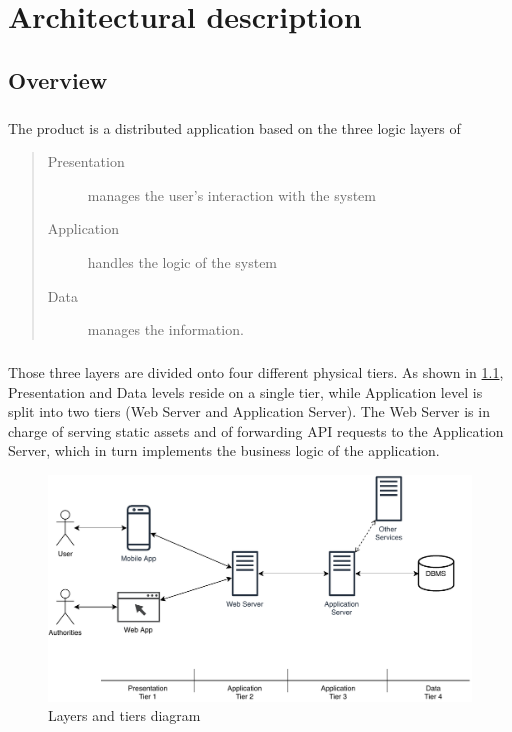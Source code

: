
	\chapter{Architectural description}
		\section{Overview}
			\paragraph{}
				The product is a distributed application based on the three logic layers of
				\begin{quote}
					\begin{description}
						\item[Presentation] manages the user's interaction with the system
						\item[Application] handles the logic of the system
						\item[Data] manages the information.
					\end{description}
				\end{quote}				 
			\paragraph{}
				Those three layers are divided onto four different physical tiers. As shown in \ref{fig:tiers}, Presentation and Data levels reside on a single tier, while Application level is split into two tiers (Web Server and Application Server). The Web Server is in charge of serving static assets and of forwarding API requests to the Application Server, which in turn implements the business logic of the application.
				\begin{figure}[!h]
					\centering
					\includegraphics[width=\textwidth]{images/DD2/SimplifiedDeploymentView.pdf}
					\caption{Layers and tiers diagram}
					\label{fig:tiers}
				\end{figure}

